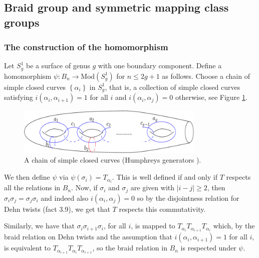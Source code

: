 \documentclass[reqno]{amsart}
\theoremstyle{definition}
\theoremstyle{remark}
\newcommand{\Mod}{{\mathrm{Mod}}}
\begin{document}
 \subsection{Braid group and symmetric mapping class groups}

 \subsubsection{The construction of the
 homomorphism}\label{birman-hilden-embedding-construction}

 Let $S_{g}^{1}$ be a surface of genus $g$ with
 one boundary component. Define a
 homomorphism $\psi \colon B_n \to 
 \Mod \left( S_g^{1} \right) $ for
 $n \le 2g+1$ as follows.
 Choose a chain of simple closed curves
 $\left\{ \alpha_i \right\} $ in
 $S_{g}^{1}$, that is, a collection of
 simple closed curves satisfying
 $i \left( \alpha_i, \alpha_{i+1} \right) =1$ for
 all $i$ and $i \left( \alpha_i, \alpha_j \right) =0$ otherwise,
 see Figure \ref{fig:Humphreys-generators-png}.

 \begin{figure}[htpb]
     \centering
     \includegraphics[width=0.8\textwidth]{Humphreys-generators.png}
     \caption{A chain of simple closed curves (Humphreys generators ).
     }
     \label{fig:Humphreys-generators-png}
 \end{figure}

 We then define $\psi $ via
 $\psi \left( \sigma_i \right) =
 T_{\alpha_i}$.
 This is well defined if and only if
 $T$ respects all the relations in
 $B_n$. Now, if $\sigma_i$ and
 $\sigma_j$ are given with 
 $\left| i-j \right| \ge 2$, then
 $\sigma_i \sigma_j = \sigma_j \sigma_i$ and
 indeed also
 $i \left( \alpha_i, \alpha_j \right) =0$ so
 by the disjointness relation for
 Dehn twists (fact 3.9), we get
 that $T$ respects this commutativity.

 Similarly, we have that
 $\sigma_i \sigma_{i+1} \sigma_i$, for all $i$,
 is mapped to 
 $T_{\alpha_i} T_{\alpha_{i+1}} T_{\alpha_i}$ which, by the
 braid relation on Dehn twists and the
 assumption that
 $i\left( \alpha_i, \alpha_{i+1} \right) =1$ for all $i$,
 is equivalent to
 $T_{\alpha_{i+1}} T_{\alpha_i}T_{\alpha_{i+1}}$, so
 the braid relation in $B_n$ is respected
 under $\psi $.
\end{document}
